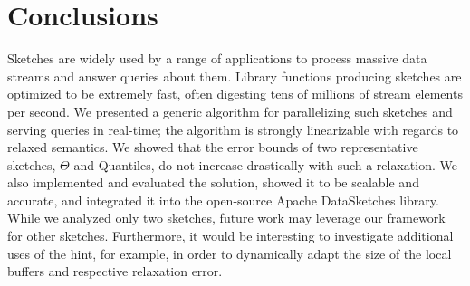\section{Conclusions}
\label{fc-sec:discussion}

Sketches are widely used by a range of applications
to process massive data streams and answer queries about them.
Library functions producing sketches
are optimized to be extremely fast, often digesting tens of millions of stream elements per second. 
We presented a generic algorithm for parallelizing such sketches and serving
queries in real-time; the algorithm is strongly linearizable with regards to relaxed semantics.
We showed that the error bounds of two representative sketches,
$\Theta$ and Quantiles, do not increase drastically with such a relaxation. We also
implemented and evaluated the solution, showed it to be scalable {and accurate}, and integrated it into
the open-source Apache DataSketches library. While we analyzed only two sketches, future work
may leverage our framework for other sketches. Furthermore, it would be interesting to investigate
additional uses of the hint, for example, in order to dynamically adapt the size of the local buffers
and respective relaxation error.